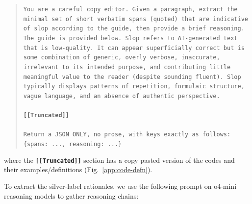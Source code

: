 \documentclass{article} %
\begin{document}
\begin{quote}  
\texttt{You are a careful copy editor. Given a paragraph, extract the minimal set of short verbatim spans (quoted) that are indicative of slop according to the guide, then provide a brief reasoning. The guide is provided below. Slop refers to AI-generated text that is low-quality. It can appear superficially correct but is some combination of generic, overly verbose, inaccurate, irrelevant to its intended purpose, and contributing little meaningful value to the reader (despite sounding fluent). Slop typically displays patterns of repetition, formulaic structure, vague language, and an absence of authentic perspective. \\\\
\textbf{[[Truncated]]} \\\\
Return a JSON ONLY, no prose, with keys exactly as follows: \\
\{spans: ..., reasoning: ...\}}
\end{quote}

where the \texttt{\textbf{[[Truncated]]}} section has a copy pasted version of the codes and their examples/definitions (Fig.~\ref{app:code-defn}).

To extract the silver-label rationales, we use the following prompt on o4-mini reasoning models to gather reasoning chains: 
\end{document}
